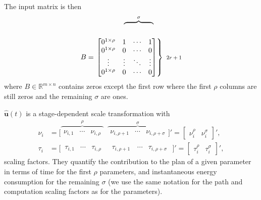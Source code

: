The input matrix is then
\[
  \hspace*{1.6ex}\begin{matrix} \hspace*{1ex} &
    \overbrace{\begin{matrix}
      \hspace*{1ex} & \hspace*{3ex} & \hspace*{1ex}
    \end{matrix}}^{\sigma}\end{matrix}
\]\vspace*{-2em}
\begin{equation}\label{eq:mat_B}
  B=\left.\begin{bmatrix}
      0^{1\times\rho} & 1      & \cdots & 1      \\
      0^{1\times\rho} & 0      & \cdots & 0      \\ 
      \vdots          & \vdots & \ddots & \vdots \\
      0^{1\times\rho} & 0      & \cdots & 0   
  \end{bmatrix}\right\}{\text{\scriptsize $2r+1$}}
\end{equation}
where $B\in\mathbb{R}^{m\times n}$ contains zeros except the first row where the first $\rho$ columns are still zeros and the remaining $\sigma$ are ones. 

$\hat{\mathbf{u}}(t)$ is a stage-dependent scale transformation with 
\begin{subequations}\label{eq:scaling}\begin{align}
\nu_i&=\Big[\overbrace{\begin{matrix}\nu_{i,1}&\cdots&\nu_{i,\rho}\end{matrix}}^{\rho} \,\,\, \overbrace{\begin{matrix}\nu_{i,\rho+1}&\cdots&\nu_{i,\rho+\sigma}\end{matrix}}^{\sigma}\Big]'=\begin{bmatrix}\nu_i^\rho & \nu_i^\sigma\end{bmatrix}',\\ 
\tau_i&=\Big[\begin{matrix}\,\tau_{i,1}&\cdots&\tau_{i,\rho}\end{matrix} \,\,\,\, \begin{matrix}\tau_{i,\rho+1}&\,\cdots&\tau_{i,\rho+\sigma}\,\,\end{matrix}\Big]'=\begin{bmatrix}\tau_i^\rho & \tau_i^\sigma\end{bmatrix}',
\end{align}\end{subequations}
scaling factors. They quantify the contribution to the plan of a given parameter in terms of time for the first $\rho$ parameters, and instantaneous energy consumption for the remaining $\sigma$ (we use the same notation for the path and computation scaling factors as for the parameters). 

